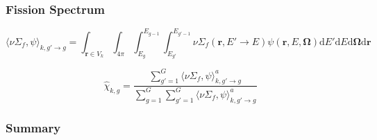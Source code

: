 \subsubsection{Fission Spectrum}
\label{subsubsec:chap3-tally-types-chi}

\begin{equation}
\label{eqn:chap3-nu-fiss-energies}
\langle \nu\Sigma_{f}, \psi \rangle_{k,g'\rightarrow g} = \int_{\mathbf{r} \in V_{k}} \int_{4\pi} \int_{E_{g}}^{E_{g-1}} \int_{E_{g'}}^{E_{g'-1}} \nu\Sigma_{f}(\mathbf{r},E'\rightarrow E)\psi(\mathbf{r},E,\mathbf{\Omega}) \mathrm{d}E'\mathrm{d}E\mathrm{d}\mathbf{\Omega}\mathrm{d}\mathbf{r}
\end{equation}


\begin{equation}
\label{eqn:chap3-nu-fiss-macro}
\hat{\chi}_{k,g} = \frac{\displaystyle\sum\limits_{g'=1}^{G} \langle \nu\Sigma_{f}, \psi \rangle_{k,g'\rightarrow g}^{a}}{\displaystyle\sum\limits_{g=1}^{G} \displaystyle\sum\limits_{g'=1}^{G} \langle \nu\Sigma_{f}, \psi \rangle_{k,g'\rightarrow g}^{a}}
\end{equation}


\subsubsection{Summary}
\label{subsubsec:chap3-tally-types-summary}


